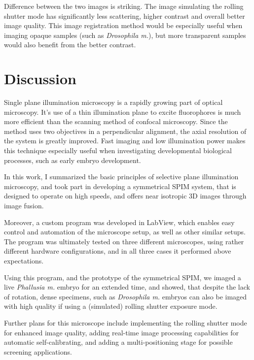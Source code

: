 \documentclass{diploma_style}
\begin{document}
Difference between the two images is striking. The image simulating the rolling shutter mode has significantly less scattering, higher contrast and overall better image quality. This image registration method would be especially useful when imaging opaque samples (such as \emph{Drosophila m.}), but more transparent samples would also benefit from the better contrast. 

\section{Discussion}
Single plane illumination microscopy is a rapidly growing part of optical microscopy. It's use of a thin illumination plane to excite fluorophores is much more efficient than the scanning method of confocal microscopy. Since the method uses two objectives in a perpendicular alignment, the axial resolution of the system is greatly improved. Fast imaging and low illumination power makes this technique especially useful when investigating developmental biological processes, such as early embryo development.

In this work, I summarized the basic principles of selective plane illumination microscopy, and took part in developing a symmetrical SPIM system, that is designed to operate on high speeds, and offers near isotropic 3D images through image fusion.

Moreover, a custom program was developed in LabView, which enables easy control and automation of the microscope setup, as well as other similar setups. The program was ultimately tested on three different microscopes, using rather different hardware configurations, and in all three cases it performed above expectations.

Using this program, and the prototype of the symmetrical SPIM, we imaged a live \textit{Phallusia m.} embryo for an extended time, and showed, that despite the lack of rotation, dense specimens, such as \textit{Drosophila m.} embryos can also be imaged with high quality if using a (simulated) rolling shutter exposure mode.

Further plans for this microscope include implementing the rolling shutter mode for enhanced image quality, adding real-time image processing capabilities for automatic self-calibrating, and adding a multi-positioning stage for possible screening applications. 
\end{document}
